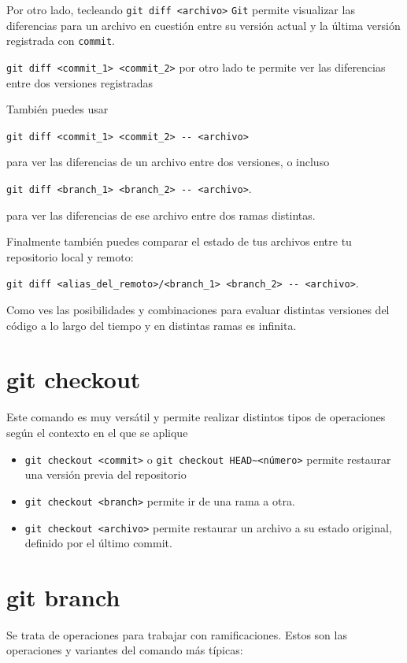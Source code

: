 \documentclass[a4paper,11pt]{report}
\newcommand{\cverb}{\Verb}
\begin{document}
    Por otro lado, tecleando \cverb+git diff <archivo>+ \verb+Git+ permite visualizar las diferencias para un archivo en cuestión entre su versión actual y la última versión registrada con \verb+commit+.
    
    \cverb+git diff <commit_1> <commit_2>+ por otro lado te permite ver las diferencias entre dos versiones registradas
    
    También puedes usar 
    
    \cverb+git diff <commit_1> <commit_2> -- <archivo>+ 
    
    para ver las diferencias de un archivo entre dos versiones, o incluso 
    
    \cverb+git diff <branch_1> <branch_2> -- <archivo>+.
    
    para ver las diferencias de ese archivo entre dos ramas distintas.
    
    Finalmente también puedes comparar el estado de tus archivos entre tu repositorio local y remoto:
    
    \cverb+git diff <alias_del_remoto>/<branch_1> <branch_2> -- <archivo>+.
    
    Como ves las posibilidades y combinaciones para evaluar distintas versiones del código a lo largo del tiempo y en distintas ramas es infinita.
    
    \section{git checkout}
      Este comando es muy versátil y permite realizar distintos tipos de operaciones según el contexto en el que se aplique
      \begin{itemize}
       \item \cverb+git checkout <commit>+ o \cverb+git checkout HEAD~<número>+ permite restaurar una versión previa del repositorio
       \item \cverb+git checkout <branch>+ permite ir de una rama a otra.
       \item \cverb+git checkout <archivo>+ permite restaurar un archivo a su estado original, definido por el último commit.
      \end{itemize}
      
    \section{git branch}
      Se trata de operaciones para trabajar con ramificaciones. Estos son las operaciones y variantes del comando más típicas:
      
\end{document}
